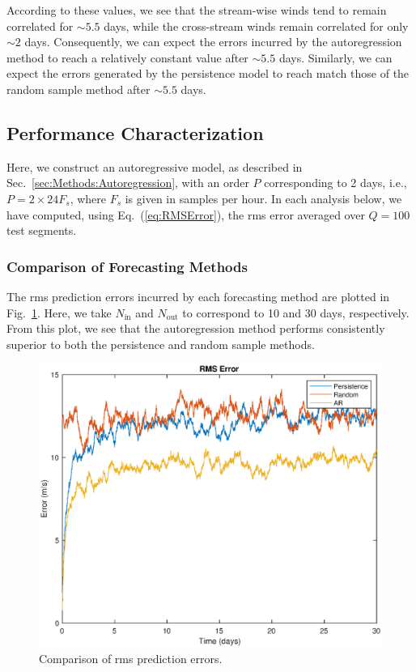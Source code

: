 \documentclass[11pt, oneside]{article}
\newcommand{\figref}[1]{Fig.~\ref{#1}}
\newcommand{\eqnref}[1]{Eq.~(\ref{#1})}
\newcommand{\secref}[1]{Sec.~\ref{#1}}
\begin{document}
According to these values, we see that the stream-wise winds tend to remain correlated for $\sim 5.5$ days, while the cross-stream winds remain correlated for only $\sim 2$ days.
Consequently, we can expect the errors incurred by the autoregression method to reach a relatively constant value after $\sim 5.5$ days.
Similarly, we can expect the errors generated by the persistence model to reach match those of the random sample method after $\sim 5.5$ days.

\subsection{Performance Characterization}
Here, we construct an autoregressive model, as described in \secref{sec:Methods:Autoregression}, with an order $P$ corresponding to 2 days, i.e., $P = 2 \times 24 F_s$, where $F_s$ is given in samples per hour.
In each analysis below, we have computed, using \eqnref{eq:RMSError}, the rms error averaged over $Q = 100$ test segments.

\subsubsection{Comparison of Forecasting Methods}\label{sec:Results:Comparison}
The rms prediction errors incurred by each forecasting method are plotted in \figref{fig:ComparisonRMS}.
Here, we take $N_\text{in}$ and $N_\text{out}$ to correspond to 10 and 30 days, respectively.
From this plot, we see that the autoregression method performs consistently superior to both the persistence and random sample methods.

\begin{figure}[htb]
\centering
\includegraphics[width=\columnwidth]{figures/ComparisonRMSPredictionError}
\caption{Comparison of rms prediction errors.}
\label{fig:ComparisonRMS}
\end{figure}
\end{document}
